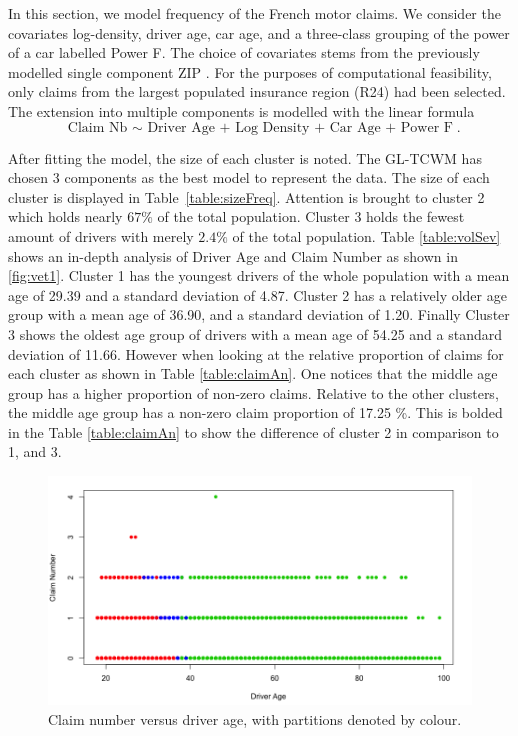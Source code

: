 \documentclass[11pt,letterpaper]{article}
\numberwithin{equation}{section}
\numberwithin{equation}{section}
\numberwithin{equation}{section}
\begin{document}
In this section, we model frequency of the French motor claims. We consider the covariates log-density, driver age, car age, and a three-class grouping of the power of a car labelled Power F. The choice of covariates stems from the previously modelled single component ZIP \citep{Charpentier:2014}. For the purposes of computational feasibility, only claims from the largest populated insurance region (R24) had been selected. %
The extension into multiple components is modelled with the linear formula
$$ \text{ Claim Nb $\sim$  Driver Age + Log Density + Car Age + Power F}. $$%

After fitting the model, the size of each cluster is noted. The GL-TCWM has chosen 3 components as the best model to represent the data. The size of each cluster is displayed in Table~\ref{table:sizeFreq}. %
Attention is brought %
to cluster 2 which holds nearly $67 \%$ of the total population. Cluster 3 holds the fewest amount of drivers with merely $2.4 \% $ of the total population. Table \ref{table:volSev} shows an in-depth analysis of Driver Age and Claim Number as shown in \ref{fig:vet1}.  Cluster 1 has the youngest drivers of the whole population with a mean age of 29.39 and a standard deviation of 4.87. Cluster 2 has a relatively older age group with a mean age of 36.90, and a standard deviation of 1.20. Finally Cluster 3 shows the oldest age group of drivers with a mean age of 54.25 and a standard deviation of 11.66. However when looking at the relative proportion of claims for each cluster as shown in Table \ref{table:claimAn}. One notices that the middle age group has a higher proportion of non-zero claims. Relative to the other clusters, the middle age group has a non-zero claim proportion of 17.25 \%. This is bolded in the Table \ref{table:claimAn} to show the difference of cluster 2 in comparison to 1, and 3.
\begin{figure}[!htb]
\label{figure:3}
\begin{center}
\includegraphics[scale=0.25]{driverVClaimNumber.png}
\end{center}
\caption{Claim number versus driver age, with partitions denoted by colour.}
\end{figure}
\end{document}
